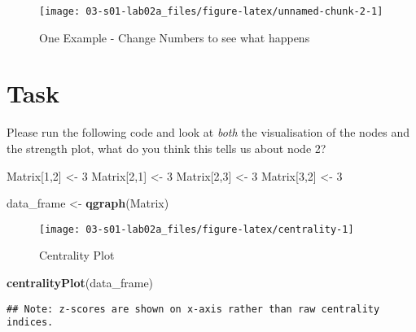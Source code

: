 \documentclass[]{book}
\newenvironment{Shaded}{\begin{snugshade}}{\end{snugshade}}
\newcommand{\DecValTok}[1]{\textcolor[rgb]{0.00,0.00,0.81}{#1}}
\newcommand{\KeywordTok}[1]{\textcolor[rgb]{0.13,0.29,0.53}{\textbf{#1}}}
\newcommand{\NormalTok}[1]{#1}
\newcommand{\StringTok}[1]{\textcolor[rgb]{0.31,0.60,0.02}{#1}}
\begin{document}
\begin{figure}

{\centering \texttt{[image: 03-s01-lab02a\_files/figure-latex/unnamed-chunk-2-1]} 

}

\caption{One Example - Change Numbers to see what happens}\label{fig:unnamed-chunk-2}
\end{figure}

\hypertarget{task}{%
\section{Task}\label{task}}

Please run the following code and look at \emph{both} the visualisation of the nodes and the strength plot, what do you think this tells us about node 2?

\begin{Shaded}
\begin{Highlighting}[]
\NormalTok{Matrix[}\DecValTok{1}\NormalTok{,}\DecValTok{2}\NormalTok{] <-}\StringTok{ }\DecValTok{3}
\NormalTok{Matrix[}\DecValTok{2}\NormalTok{,}\DecValTok{1}\NormalTok{] <-}\StringTok{ }\DecValTok{3}
\NormalTok{Matrix[}\DecValTok{2}\NormalTok{,}\DecValTok{3}\NormalTok{] <-}\StringTok{ }\DecValTok{3}
\NormalTok{Matrix[}\DecValTok{3}\NormalTok{,}\DecValTok{2}\NormalTok{] <-}\StringTok{ }\DecValTok{3}

\NormalTok{data_frame <-}\StringTok{ }\KeywordTok{qgraph}\NormalTok{(Matrix)}
\end{Highlighting}
\end{Shaded}

\begin{figure}

{\centering \texttt{[image: 03-s01-lab02a\_files/figure-latex/centrality-1]} 

}

\caption{Centrality Plot}\label{fig:centrality1}
\end{figure}

\begin{Shaded}
\begin{Highlighting}[]
\KeywordTok{centralityPlot}\NormalTok{(data_frame)}
\end{Highlighting}
\end{Shaded}

\begin{verbatim}
## Note: z-scores are shown on x-axis rather than raw centrality indices.
\end{verbatim}
\end{document}
